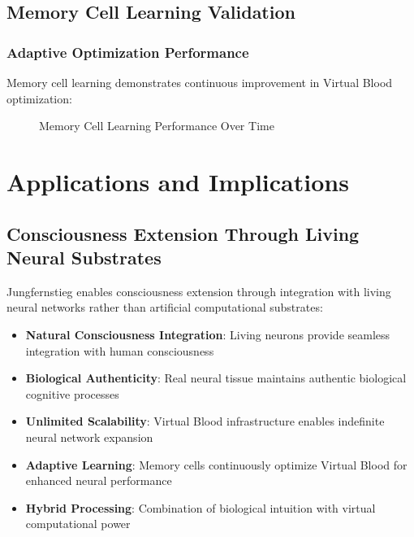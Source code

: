 \documentclass[12pt,a4paper]{article}
\begin{document}
\subsection{Memory Cell Learning Validation}

\subsubsection{Adaptive Optimization Performance}

Memory cell learning demonstrates continuous improvement in Virtual Blood optimization:

\begin{figure}[htbp]
\centering
{}
\caption{Memory Cell Learning Performance Over Time}
\end{figure}

\section{Applications and Implications}

\subsection{Consciousness Extension Through Living Neural Substrates}

Jungfernstieg enables consciousness extension through integration with living neural networks rather than artificial computational substrates:

\begin{itemize}
\item \textbf{Natural Consciousness Integration}: Living neurons provide seamless integration with human consciousness
\item \textbf{Biological Authenticity}: Real neural tissue maintains authentic biological cognitive processes
\item \textbf{Unlimited Scalability}: Virtual Blood infrastructure enables indefinite neural network expansion
\item \textbf{Adaptive Learning}: Memory cells continuously optimize Virtual Blood for enhanced neural performance
\item \textbf{Hybrid Processing}: Combination of biological intuition with virtual computational power
\end{itemize}
\end{document}
